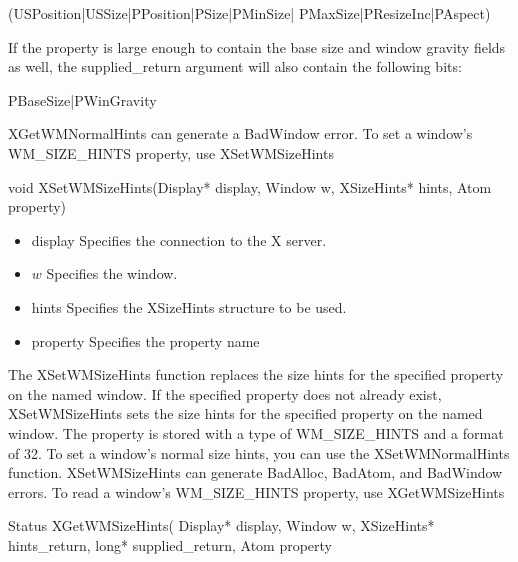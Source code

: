 \documentclass{report}
\begin{document}
\begin{itemize}
\begin{itemize}
            \bigbreak \noindent 
            \begin{cppcode}
                (USPosition|USSize|PPosition|PSize|PMinSize| PMaxSize|PResizeInc|PAspect)
            \end{cppcode}
            \bigbreak \noindent 
            If the property is large enough to contain the base size and window gravity fields as well, the supplied\_return argument will also contain the following bits:
            \bigbreak \noindent 
            \begin{cppcode}
            PBaseSize|PWinGravity
            \end{cppcode}
            \bigbreak \noindent 
            XGetWMNormalHints can generate a BadWindow error.
            \bigbreak \noindent 
            To set a window’s WM\_SIZE\_HINTS property, use XSetWMSizeHints
            \bigbreak \noindent 
            \begin{cppcode}
            void XSetWMSizeHints(Display* display, Window w, XSizeHints* hints, Atom property)
            \end{cppcode}
            \begin{itemize}
                \item display Specifies the connection to the X server.
                \item $w$ Specifies the window.
                \item hints Specifies the XSizeHints structure to be used.
                \item property Specifies the property name
            \end{itemize}
            The XSetWMSizeHints function replaces the size hints for the specified property on the named window. If the specified property does not already exist, XSetWMSizeHints sets the size hints for the specified property on the named window. The property is stored with a type of WM\_SIZE\_HINTS and a format of 32. To set a window’s normal size hints, you can use the XSetWMNormalHints function.
            \bigbreak \noindent 
            XSetWMSizeHints can generate BadAlloc, BadAtom, and BadWindow errors.
            \bigbreak \noindent 
            To read a window’s WM\_SIZE\_HINTS property, use XGetWMSizeHints
            \bigbreak \noindent 
            \begin{cppcode}
            Status XGetWMSizeHints(
                Display* display,
                Window w,
                XSizeHints* hints_return,
                long* supplied_return,
                Atom property

\end{cppcode}
\end{itemize}
\end{itemize}
\end{document}
